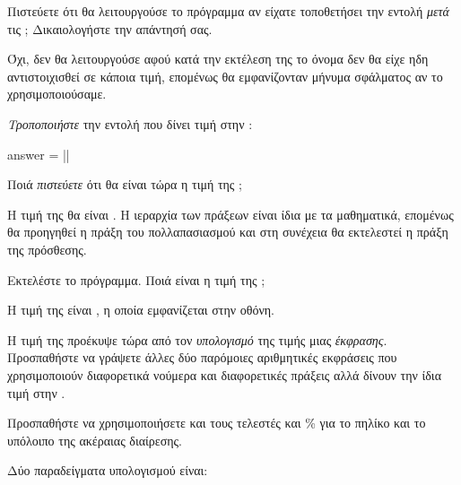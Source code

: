 \documentclass[a4paper,11pt,oneside]{book}
\begin{document}
\begin{step}
Πιστεύετε ότι θα λειτουργούσε το πρόγραμμα αν είχατε τοποθετήσει την εντολή  \emph{μετά} τις ; Δικαιολογήστε την απάντησή σας.

\begin{answer}
Όχι, δεν θα λειτουργούσε αφού κατά την εκτέλεση της  το όνομα  δεν θα είχε ηδη αντιστοιχισθεί σε κάποια τιμή, επομένως θα εμφανίζονταν μήνυμα σφάλματος αν το χρησιμοποιούσαμε.
\end{answer}
\end{step}

\begin{step}
\label{step:answer-compute}
\emph{Τροποποιήστε} την εντολή που δίνει τιμή στην :

\begin{pyplain}
answer = ||
\end{pyplain}

Ποιά \emph{πιστεύετε} ότι θα είναι τώρα η τιμή της ;

\begin{answer}[]
Η τιμή της  θα είναι . Η ιεραρχία των πράξεων είναι ίδια με τα μαθηματικά, επομένως θα προηγηθεί η πράξη του πολλαπασιασμού και στη συνέχεια θα εκτελεστεί η πράξη της πρόσθεσης.
\end{answer}

Εκτελέστε το πρόγραμμα. Ποιά είναι η τιμή της ; 

\begin{answer}
Η τιμή της  είναι , η οποία εμφανίζεται στην οθόνη.
\end{answer}

Η τιμή της  προέκυψε τώρα από τον \emph{υπολογισμό} της τιμής μιας \emph{έκφρασης}. Προσπαθήστε να γράψετε άλλες δύο παρόμοιες αριθμητικές εκφράσεις που χρησιμοποιούν διαφορετικά νούμερα και διαφορετικές πράξεις αλλά δίνουν την ίδια τιμή στην .

\begin{note}
Προσπαθήστε να χρησιμοποιήσετε και τους τελεστές \pyinline{//} και \% για το πηλίκο και το υπόλοιπο της ακέραιας διαίρεσης.
\end{note}

\begin{answer}
Δύο παραδείγματα υπολογισμού είναι:
\renewcommand{\labelenumi}{\theenumi.}
\end{answer}
\end{step}
\end{document}
